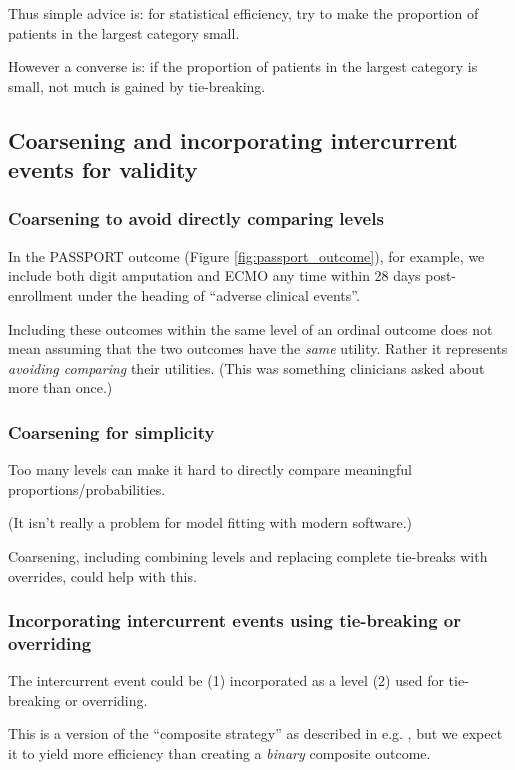 \documentclass[
  11pt,
  fleqn
]{article}
\begin{document}
Thus simple advice is: for statistical efficiency, try to make the proportion
of patients in the largest category small.

However a converse is: if the proportion of patients in the largest category is
small, not much is gained by tie-breaking.

\subsection{Coarsening and incorporating intercurrent events for validity}

\subsubsection{Coarsening to avoid directly comparing levels}

In the PASSPORT outcome (Figure \ref{fig:passport_outcome}), for
example, we include both digit
amputation and ECMO
any time within 28 days post-enrollment under the heading of
``adverse clinical events''.

Including these outcomes within the same level of an
ordinal outcome does not mean assuming that the two outcomes have the
\emph{same} utility. Rather it represents \emph{avoiding comparing}
their utilities. (This was something clinicians asked about more than once.)

\subsubsection{Coarsening for simplicity}

Too many levels can make it hard to directly compare meaningful
proportions/probabilities.

(It isn't really a problem for model fitting with modern software.)

Coarsening, including combining levels and replacing complete
tie-breaks with overrides, could help with this.

\subsubsection{Incorporating intercurrent events using tie-breaking
or overriding}

The intercurrent event could be (1) incorporated as a level (2) used
for tie-breaking or overriding.

This is a version of the ``composite strategy'' as described in e.g.
\citet{kahanEstimandsFrameworkPrimer2024}, but we expect it to yield
more efficiency than creating a \emph{binary} composite outcome.
\end{document}
